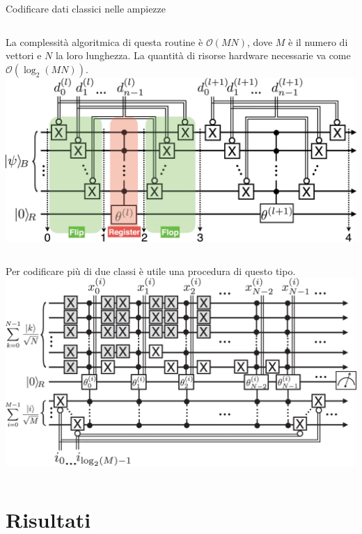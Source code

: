 \documentclass{beamer}
\begin{document}
    \begin{frame}{Codificare dati classici nelle ampiezze}
        \begin{columns}
            La complessità algoritmica di questa routine è $\mathcal{O}(MN)$, dove $M$ è il numero di 
            vettori e $N$ la loro lunghezza. La quantità di risorse hardware necessarie va 
            come $\mathcal{O}(\log_2(MN))$. \cite{petruccione} 
            \includegraphics[width=\columnwidth]{gfx/qram}
        \end{columns}

        \begin{columns}
            Per codificare più di due classi è utile una procedura di questo tipo. 
            \includegraphics[width=\columnwidth]{gfx/qram_qsvm}
        \end{columns}
    \end{frame}

    \section{Risultati}
\end{document}
